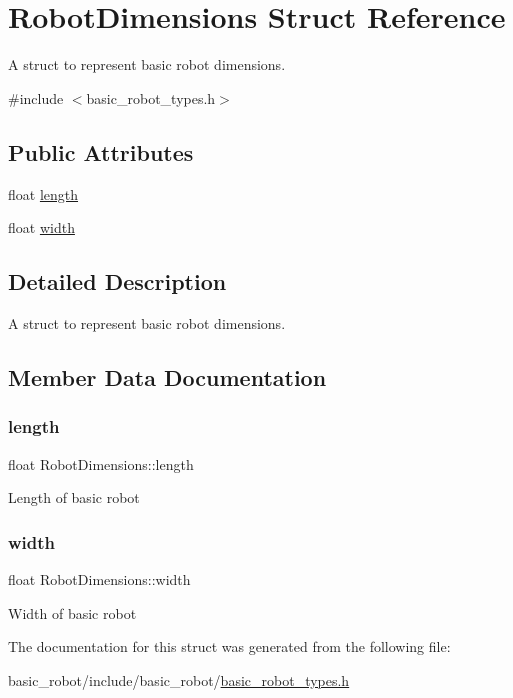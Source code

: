\hypertarget{structRobotDimensions}{}\section{Robot\+Dimensions Struct Reference}
\label{structRobotDimensions}


A struct to represent basic robot dimensions.  




{\ttfamily \#include $<$basic\+\_\+robot\+\_\+types.\+h$>$}

\subsection*{Public Attributes}
\begin{DoxyCompactItemize}
\item 
float \hyperlink{structRobotDimensions_a1abfd5695cb235eadef4625d23505218}{length}
\item 
float \hyperlink{structRobotDimensions_a25b2ecd6686320d362ef8a0d0ca60f2d}{width}
\end{DoxyCompactItemize}


\subsection{Detailed Description}
A struct to represent basic robot dimensions. 

\subsection{Member Data Documentation}
\mbox{\label{structRobotDimensions_a1abfd5695cb235eadef4625d23505218}} 
\subsubsection{\texorpdfstring{length}{length}}
{\footnotesize\ttfamily float Robot\+Dimensions\+::length}

Length of basic robot \mbox{\label{structRobotDimensions_a25b2ecd6686320d362ef8a0d0ca60f2d}} 
\subsubsection{\texorpdfstring{width}{width}}
{\footnotesize\ttfamily float Robot\+Dimensions\+::width}

Width of basic robot 

The documentation for this struct was generated from the following file\+:\begin{DoxyCompactItemize}
\item 
basic\+\_\+robot/include/basic\+\_\+robot/\hyperlink{basic__robot__types_8h}{basic\+\_\+robot\+\_\+types.\+h}\end{DoxyCompactItemize}
